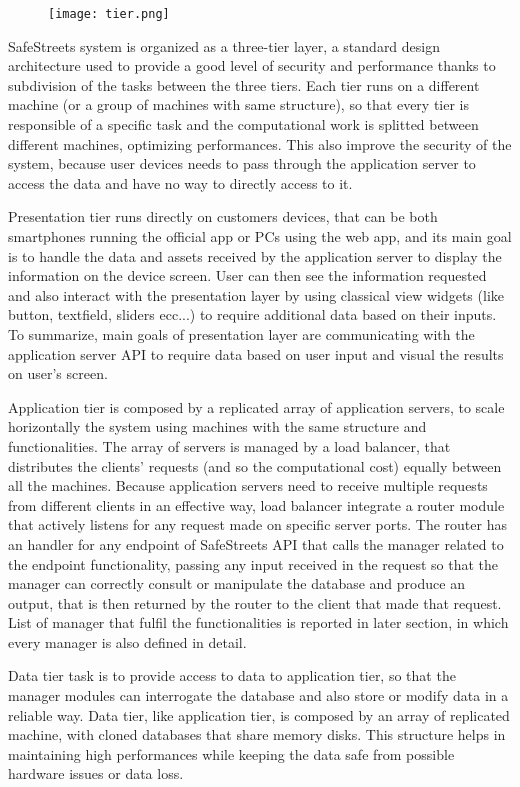 \begin{figure}[H]
	\texttt{[image: tier.png]}
\end{figure}

SafeStreets system is organized as a three-tier layer, a standard design architecture used to provide a good level of security and performance thanks to subdivision of the tasks between the three tiers. Each tier runs on a different machine (or a group of machines with same structure), so that every tier is responsible of a specific task and the computational work is splitted between different machines, optimizing performances. This also improve the security of the system, because user devices needs to pass through the application server to access the data and have no way to directly access to it. 

Presentation tier runs directly on customers devices, that can be both smartphones running the official app or PCs using the web app, and its main goal is to handle the data and assets received by the application server to display the information on the device screen. User can then see the information requested and also interact with the presentation layer by using classical view widgets (like button, textfield, sliders ecc...) to require additional data based on their inputs. To summarize, main goals of presentation layer are communicating with the application server API to require data based on user input and visual the results on user's screen.

Application tier is composed by a replicated array of application servers, to scale horizontally the system using machines with the same structure and functionalities. The array of servers is managed by a load balancer, that distributes the clients' requests (and so the computational cost) equally between all the machines. Because application servers need to receive multiple requests from different clients in an effective way, load balancer integrate a router module that actively listens for any request made on specific server ports. The router has an handler for any endpoint of SafeStreets API that calls the manager related to the endpoint functionality, passing any input received in the request so that the manager can correctly consult or manipulate the database and produce an output, that is then returned by the router to the client that made that request. List of manager that fulfil the functionalities is reported in later section, in which every manager is also defined in detail.

Data tier task is to provide access to data to application tier, so that the manager modules can interrogate the database and also store or modify data in a reliable way. Data tier, like application tier, is composed by an array of replicated machine, with cloned databases that share memory disks. This structure helps in maintaining high performances while keeping the data safe from possible hardware issues or data loss.